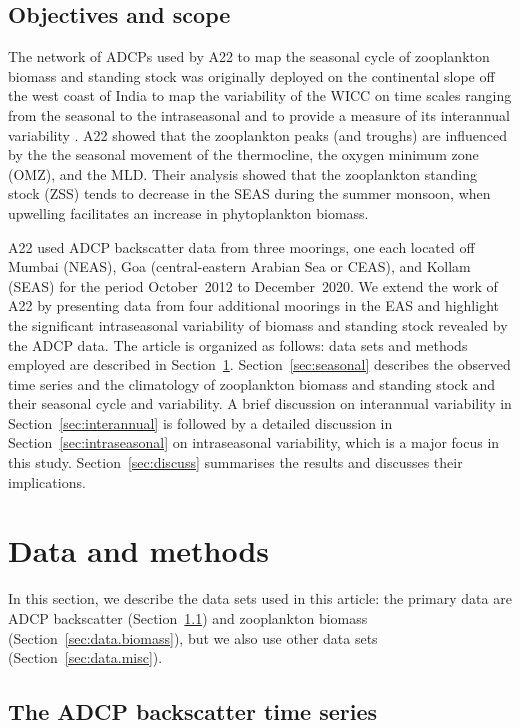 \documentclass[authoryear,review,11pt]{elsarticle}
\begin{document}
\subsection{Objectives and scope}
\label{sec:intro.scope}

The network of ADCPs used by A22 to map the seasonal cycle of zooplankton biomass and standing stock was originally deployed on the continental slope off the west coast of India to map the variability of the WICC on time scales ranging from the seasonal to the intraseasonal and to provide a measure of its interannual variability \citep{amol2014observed, chaudhuri2020observed}. A22 showed that the zooplankton peaks (and troughs) are influenced by the the seasonal movement of the thermocline, the oxygen minimum zone (OMZ), and the MLD. Their analysis showed that the zooplankton standing stock (ZSS) tends to decrease in the SEAS during the summer monsoon, when upwelling facilitates an increase in phytoplankton biomass.

A22 used ADCP backscatter data from three moorings, one each located off Mumbai (NEAS), Goa (central-eastern Arabian Sea or CEAS), and Kollam (SEAS) for the period October~2012 to December~2020.  We extend the work of A22 by presenting data from four additional moorings in the EAS and highlight the significant intraseasonal variability of biomass and standing stock revealed by the ADCP data. The article is organized as follows: data sets and methods employed are described in Section~\ref{sec:data}. Section~\ref{sec:seasonal} describes the observed time series and the climatology of zooplankton biomass and standing stock and their seasonal cycle and variability. A brief discussion on interannual variability in Section~\ref{sec:interannual} is followed by a detailed discussion in Section~\ref{sec:intraseasonal} on intraseasonal variability, which is a major focus in this study. Section~\ref{sec:discuss} summarises the results and discusses their implications.


\section{Data and methods}
\label{sec:data}

In this section, we describe the data sets used in this article: the primary data are ADCP backscatter (Section~\ref{sec:data.bs}) and zooplankton biomass (Section~\ref{sec:data.biomass}), but we also use other data sets (Section~\ref{sec:data.misc}).

\subsection{The ADCP backscatter time series}
\label{sec:data.bs}
\end{document}
